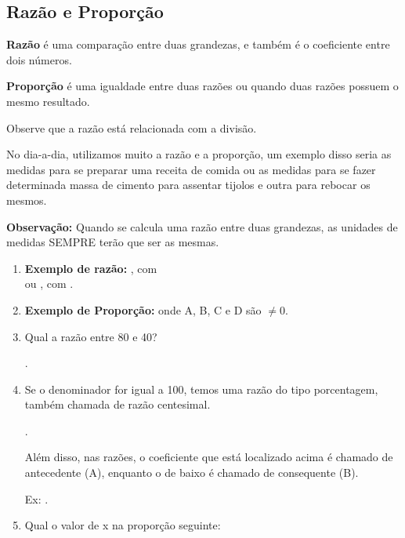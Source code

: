 \begin{multicols*}{2}
		\section{Razão e Proporção}

		\textbf{Razão} é uma comparação entre duas grandezas, e também é o coeficiente entre dois números.
		
		\textbf{Proporção} é uma igualdade entre duas razões ou quando duas razões possuem o mesmo resultado.
		
		Observe que a razão está relacionada com a divisão.
		
		No dia-a-dia, utilizamos muito a razão e a proporção, um exemplo disso seria as medidas para se preparar uma receita de comida ou as medidas para se fazer determinada massa de cimento para assentar tijolos e outra para rebocar os mesmos.
		
		\textbf{Observação:} Quando se calcula uma razão entre duas grandezas, as unidades de medidas SEMPRE terão que ser as mesmas.
		
		\begin{enumerate}
		
		\item \textbf{Exemplo de razão:}  , com\\
		
			 ou , com .
		
		\item \textbf{Exemplo de Proporção:} 	onde A, B, C e D são $\neq 0$.
		
		\item Qual a razão entre 80 e 40? 
		
		.
		
		\item Se o denominador for igual a 100, temos uma razão do tipo porcentagem, também chamada de razão centesimal.
		
		.
		
		Além disso, nas razões, o coeficiente que está localizado acima é chamado de antecedente (A), enquanto o de baixo é chamado de consequente (B).
		
		Ex: .
		
		\item Qual o valor de x na proporção seguinte:
		

\end{enumerate}
\end{multicols*}
